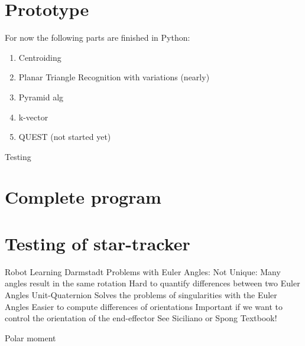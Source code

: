 \documentclass[12pt,a4paper,oneside]{article}
\begin{document}
\section{Prototype}
For now the following parts are finished in Python:
\begin{enumerate}
\item Centroiding
\item Planar Triangle Recognition with variations (nearly)
\item Pyramid alg
\item k-vector
\item QUEST (not started yet)
\end{enumerate}
Testing\par
\cite{kruijff2003star}
\newpage
\section{Complete program}

\newpage
\section{Testing of star-tracker}
\cite{RIS_0}

\newpage






\newpage

\listoftables

\newpage

\listoffigures

\newpage


Robot Learning Darmstadt
Problems with Euler Angles:
Not Unique: Many angles result in the same rotation
Hard to quantify differences between two Euler Angles
Unit-Quaternion
Solves the problems of singularities with the Euler Angles
Easier to compute differences of orientations
Important if we want to control the orientation of the end-effector
See Siciliano or Spong Textbook!


Polar moment
\end{document}
